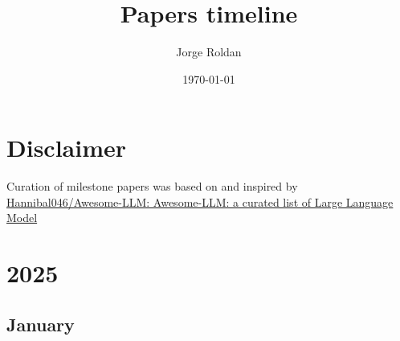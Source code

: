 \documentclass[12pt]{article}
\begin{document}
\title{\Large Papers timeline}
\author{Jorge Roldan}
\date{\today}

\maketitle

\tableofcontents

\newpage
\section{Disclaimer}
Curation of milestone papers was based on and inspired by \href{https://github.com/Hannibal046/Awesome-LLM}
{Hannibal046/Awesome-LLM: Awesome-LLM: a curated list of Large Language Model}

\newpage
\section{2025}




\subsection{January}
\begin{refsection}
    \nocite{deepseek-ai_deepseek-r1_2025}
    \printbibliography[heading=none]
\end{refsection}
\end{document}
